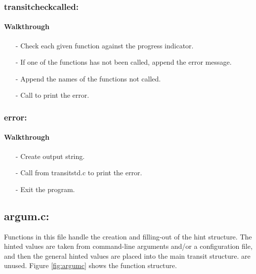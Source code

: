 \documentclass[letterpaper,12pt]{article}
\begin{document}
\subsubsection{transitcheckcalled:}
\paragraph{Walkthrough}
\begin{enumerate}[leftmargin=10pt, noitemsep, parsep=0pt, topsep=0ex]
\item[-] Check each given function against the progress indicator.
\item[-] If one of the functions has not been called, append the error message.
\item[-] Append the names of the functions not called.
\item[-] Call  to print the error.
\end{enumerate}

\subsubsection{error:}
\paragraph{Walkthrough}
\begin{enumerate}[leftmargin=10pt, noitemsep, parsep=0pt, topsep=0ex]
\item[-] Create output string.
\item[-] Call  from transitstd.c to print the error.
\item[-] Exit the program.
\end{enumerate}

\newpage
\subsection{argum.c:} 
Functions in this file handle the creation and filling-out of the hint structure. The hinted values are taken from command-line arguments and/or a configuration file, and then the general hinted values are placed into the main transit structure.  are unused. Figure \ref{fig:argumc} shows the function structure.
\end{document}
